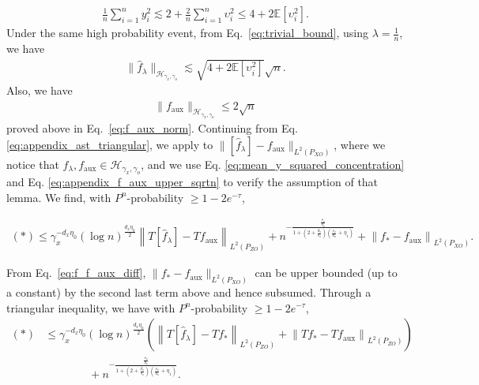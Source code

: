 \documentclass[11pt]{article}
\newcommand{\calH}{\mathcal{H}}
\newcommand{\0}{\mathbf{0}}
\begin{document}
\begin{appendix}
\begin{align*}
    \frac{1}{n}\sum_{i=1}^{n}y_i^2  \lesssim 2 + \frac{2}{n}\sum_{i=1}^{n}\upsilon_i^2 \leq 4 + 2\mathbb{E}\left[\upsilon_i^2\right].
\end{align*}
Under the same high probability event, from Eq.~\eqref{eq:trivial_bound}, using $\lambda = \frac{1}{n}$, we have
\begin{align}
\label{eq:mean_y_squared_concentration}
    \|\hat{f}_{\lambda}\|_{\calH_{\gamma_x,\gamma_o}} \lesssim \sqrt{4 + 2\mathbb{E}\left[\upsilon_i^2\right]}\sqrt{n}. 
\end{align}
Also, we have 
\begin{align}
\label{eq:appendix_f_aux_upper_sqrtn}
    \|f_{\mathrm{aux}}\|_{\calH_{\gamma_x,\gamma_o}}\leq 2\sqrt{n}
\end{align}
proved above in Eq.~\eqref{eq:f_aux_norm}. Continuing from Eq. \eqref{eq:appendix_ast_triangular}, we apply  to $\|[\hat{f}_{\lambda}] - f_{\mathrm{aux}}\|_{L^2(P_{XO})}$, where we notice that $\hat{f}_{\lambda}, f_{\mathrm{aux}}\in \calH_{\gamma_x,\gamma_o}$, and we use Eq. \eqref{eq:mean_y_squared_concentration} and Eq. \eqref{eq:appendix_f_aux_upper_sqrtn} to verify the assumption of that lemma. We find, with $P^n$-probability $\geq 1 - 2e^{-\tau}$,
\begin{small}
\begin{align*}
    (\ast) \leq \gamma_x^{-d_x\eta_0} (\log n)^{\frac{d_x\eta_0}{2}} \left\| T \left[\hat{f}_{\lambda}\right] -  T f_{\mathrm{aux}} \right\|_{L^2(P_{ZO})} + n^{-\frac{\frac{s_x}{d_x} }{1+(2 + \frac{d_o}{s_o})(\frac{s_x}{d_x}+\eta_1)}} + \left\|f_{\ast} -  f_{\mathrm{aux}} \right\|_{L^2(P_{XO})} .
\end{align*}
\end{small}
From Eq.~\eqref{eq:f_f_aux_diff}, $\|f_{\ast} -  f_{\mathrm{aux}}\|_{L^2(P_{XO})}$ can be upper bounded (up to a constant) by the second last term above and hence subsumed. 
Through a triangular inequality, we have with $P^n$-probability $\geq 1 - 2e^{-\tau}$,
\begin{align}
    (\ast) &\leq \gamma_x^{-d_x\eta_0} (\log n)^{\frac{d_x\eta_0}{2}} \left(\left\| T \left[\hat{f}_{\lambda}\right] -  T f_{\ast} \right\|_{L^2(P_{ZO})}  +  \left\| T f_\ast -  T f_{\mathrm{aux}} \right\|_{L^2(P_{ZO})}\right) \nonumber \\
    &\qquad \qquad + n^{-\frac{\frac{s_x}{d_x} }{1+(2 + \frac{d_o}{s_o})(\frac{s_x}{d_x}+\eta_1)}} \label{eq:unprojected_amplified_projected_example} .
\end{align}

\end{appendix}
\end{document}
